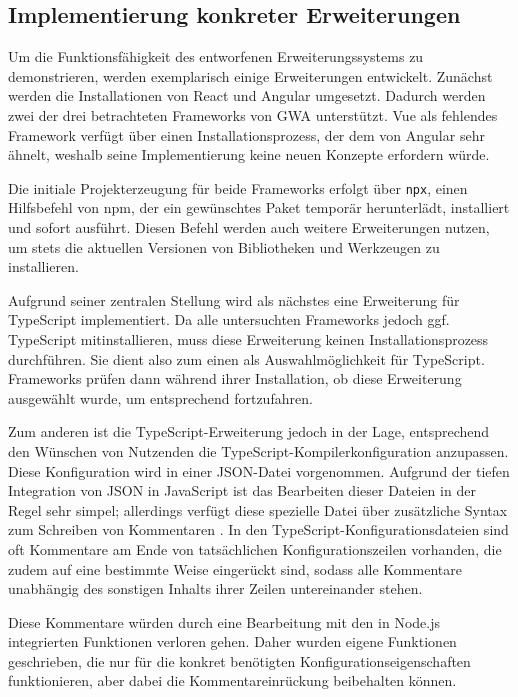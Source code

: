 \subsection{Implementierung konkreter Erweiterungen}
Um die Funktionsfähigkeit des entworfenen Erweiterungssystems zu demonstrieren, werden exemplarisch einige Erweiterungen entwickelt. Zunächst werden die Installationen von React und Angular umgesetzt. Dadurch werden zwei der drei betrachteten Frameworks von \gls{GWA} unterstützt. Vue als fehlendes Framework verfügt über einen Installationsprozess, der dem von Angular sehr ähnelt, weshalb seine Implementierung keine neuen Konzepte erfordern würde.

Die initiale Projekterzeugung für beide Frameworks erfolgt über \verb/npx/, einen Hilfsbefehl von \gls{npm}, der ein gewünschtes Paket temporär herunterlädt, installiert und sofort ausführt. Diesen Befehl werden auch weitere Erweiterungen nutzen, um stets die aktuellen Versionen von Bibliotheken und Werkzeugen zu installieren.

Aufgrund seiner zentralen Stellung wird als nächstes eine Erweiterung für TypeScript implementiert. Da alle untersuchten Frameworks jedoch ggf. TypeScript mitinstallieren, muss diese Erweiterung keinen Installationsprozess durchführen. Sie dient also zum einen als Auswahlmöglichkeit für TypeScript. Frameworks prüfen dann während ihrer Installation, ob diese Erweiterung ausgewählt wurde, um entsprechend fortzufahren.

Zum anderen ist die TypeScript-Erweiterung jedoch in der Lage, entsprechend den Wünschen von Nutzenden die TypeScript-Kompilerkonfiguration anzupassen. Diese Konfiguration wird in einer \gls{JSON}-Datei vorgenommen. Aufgrund der tiefen Integration von \gls{JSON} in JavaScript ist das Bearbeiten dieser Dateien in der Regel sehr simpel; allerdings verfügt diese spezielle Datei über zusätzliche Syntax zum Schreiben von Kommentaren \cite{JSON_MDN}. In den TypeScript-Konfigurationsdateien sind oft Kommentare am Ende von tatsächlichen Konfigurationszeilen vorhanden, die zudem auf eine bestimmte Weise eingerückt sind, sodass alle Kommentare unabhängig des sonstigen Inhalts ihrer Zeilen untereinander stehen.

Diese Kommentare würden durch eine Bearbeitung mit den in Node.js integrierten Funktionen verloren gehen. Daher wurden eigene Funktionen geschrieben, die nur für die konkret benötigten Konfigurationseigenschaften funktionieren, aber dabei die Kommentareinrückung beibehalten können.

